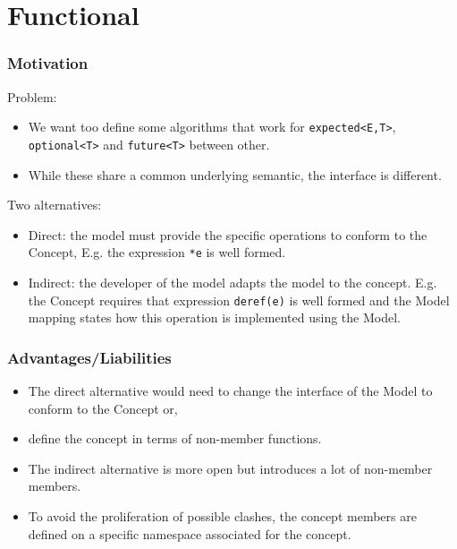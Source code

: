 \documentclass[xcolor=dvipsnames]{beamer}
\newcommand{\cpp}[1]{\lstinline{#1}}
\begin{document}
\section{Functional}
\begin{frame}[fragile]
\frametitle{Motivation}

Problem:

\begin{itemize}
  \item We want too define some algorithms that work for \cpp{expected<E,T>}, \cpp{optional<T>} and \cpp{future<T>} between other.
  \item While these share a common underlying semantic, the interface is different.
\end{itemize}

Two alternatives:

\begin{itemize}
  \item Direct: the model must provide the specific operations to conform to the Concept, E.g. the expression \cpp{*e} is well formed.
  \item Indirect: the developer of the model adapts the model to the concept. E.g. the Concept requires that expression \cpp{deref(e)} is well formed and the Model mapping states how this operation is implemented using the Model.
\end{itemize}
\end{frame}
\begin{frame}[fragile]
\frametitle{Advantages/Liabilities}

\begin{itemize}
  \item The direct alternative would need to change the interface of the Model to conform to the Concept or,
    \item define the concept in terms of non-member functions.
   \item The indirect alternative is more open but introduces a lot of non-member members. 
   \item To avoid the proliferation of possible clashes, the concept members are defined on a specific namespace associated for the concept. 
\end{itemize}

\end{frame}
\end{document}
